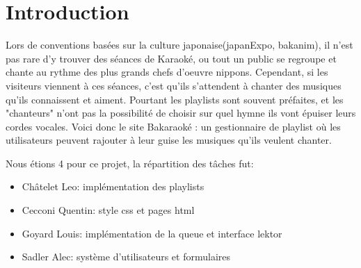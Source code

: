 \section{Introduction}
    Lors de conventions basées sur la culture japonaise(japanExpo, bakanim), il n'est pas rare d'y trouver des séances de Karaoké, ou tout un public se regroupe et chante au rythme des plus grands chefs d'oeuvre nippons. \newline
Cependant, si les visiteurs viennent à ces séances, c'est qu'ils s'attendent à chanter des musiques qu'ils connaissent et aiment. Pourtant les playlists sont souvent préfaites, et les "chanteurs" n'ont pas la possibilité de choisir sur quel hymne ils vont épuiser leurs cordes vocales. \newline
Voici donc le site Bakaraoké : un gestionnaire de playlist où les utilisateurs peuvent rajouter à leur guise les musiques qu'ils veulent chanter. \newline

Nous étions 4 pour ce projet, la répartition des tâches fut:
\begin{itemize}
    \item Châtelet Leo: implémentation des playlists
    \item Cecconi Quentin: style css et pages html
    \item Goyard Louis: implémentation de la queue et interface lektor
    \item Sadler Alec: système d'utilisateurs et formulaires
\end{itemize}
